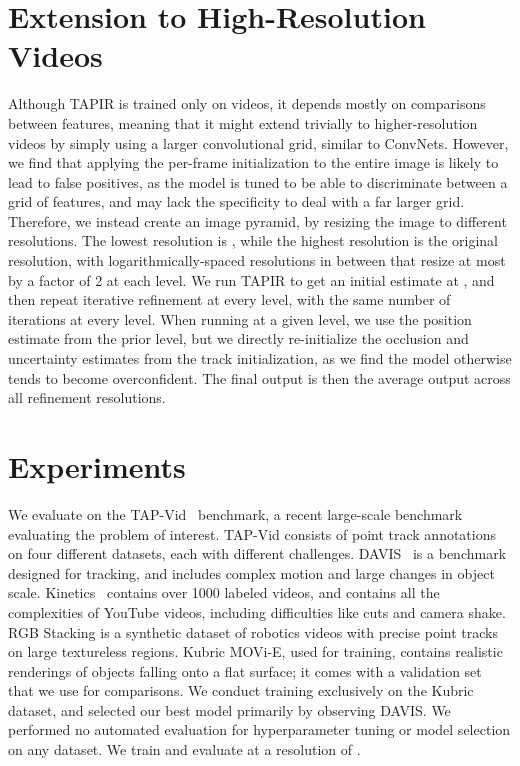 \documentclass[10pt,twocolumn,letterpaper]{article}
\begin{document}
\section{Extension to High-Resolution Videos}
Although TAPIR is trained only on  videos, it depends mostly on comparisons between features, meaning that it might extend trivially to higher-resolution videos by simply using a larger convolutional grid, similar to ConvNets.  However, we find that applying the per-frame initialization to the entire image is likely to lead to false positives, as the model is tuned to be able to discriminate between a  grid of features, and may lack the specificity to deal with a far larger grid.  Therefore, we instead create an image pyramid, by resizing the image to  different resolutions.  The lowest resolution is , while the highest resolution is the original resolution, with logarithmically-spaced resolutions in between that resize at most by a factor of 2 at each level.  We run TAPIR to get an initial estimate at , and then repeat iterative refinement at every level, with the same number of iterations at every level.  When running at a given level, we use the position estimate from the prior level, but we directly re-initialize the occlusion and uncertainty estimates from the track initialization, as we find the model otherwise tends to become overconfident.  The final output is then the average output across all refinement resolutions.


\section{Experiments}

We evaluate on the TAP-Vid~\cite{doersch2022tap} benchmark, a recent large-scale benchmark evaluating the problem of interest.  TAP-Vid consists of point track annotations on four different datasets, each with different challenges.  DAVIS~\cite{pont20172017} is a benchmark designed for tracking, and includes complex motion and large changes in object scale. Kinetics~\cite{carreira2017quo} contains over 1000 labeled videos, and contains all the complexities of YouTube videos, including difficulties like cuts and camera shake.  RGB Stacking is a synthetic dataset of robotics videos with precise point tracks on large textureless regions.  Kubric MOVi-E, used for training, contains realistic renderings of objects falling onto a flat surface; it comes with a validation set that we use for comparisons. We conduct training exclusively on the Kubric dataset, and selected our best model primarily by observing DAVIS.  We performed no automated evaluation for hyperparameter tuning or model selection on any dataset.  We train and evaluate at a resolution of . 
\end{document}
